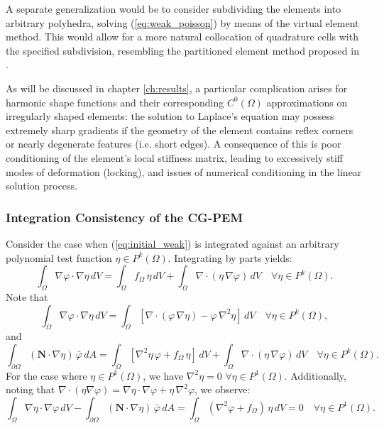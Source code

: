 	A separate generalization would be to consider subdividing the elements into arbitrary polyhedra, solving (\ref{eq:weak_poisson}) by means of the virtual element method. This would allow for a more natural collocation of quadrature cells with the specified subdivision, resembling the partitioned element method proposed in \cite{Rashid:12}.
	
	As will be discussed in chapter \ref{ch:results}, a particular complication arises for harmonic shape functions and their corresponding $C^0 (\Omega)$ approximations on irregularly shaped elements: the solution to Laplace's equation may possess extremely sharp gradients if the geometry of the element contains reflex corners or nearly degenerate features (i.e. short edges). A consequence of this is poor conditioning of the element's local stiffness matrix, leading to excessively stiff modes of deformation (locking), and issues of numerical conditioning in the linear solution process.
	
\subsubsection*{Integration Consistency of the CG-PEM}

	Consider the case when (\ref{eq:initial_weak}) is integrated against an arbitrary polynomial test function $\eta \in P^k (\Omega)$. Integrating by parts yields:
	\begin{equation}
		\int_\Omega \nabla \varphi \cdot \nabla \eta \, dV = \int_\Omega f_{\Omega} \, \eta \, dV + \int_{\Omega} \nabla \cdot (\eta \, \nabla \varphi) \, dV \quad \forall \eta \in P^k (\Omega).
	\end{equation}
	Note that
	\begin{equation}
		\int_\Omega \nabla \varphi \cdot \nabla \eta \, dV = \int_\Omega \left[ \nabla \cdot (\varphi \, \nabla \eta) - \varphi \, \nabla^2 \eta \right] \, dV \quad \forall \eta \in P^k (\Omega),
	\end{equation}
	and
	\begin{equation}
		\int_{\partial \Omega} (\mathbf{N} \cdot \nabla \eta) \, \bar{\varphi} \, dA = \int_\Omega \left[ \nabla^2 \eta \, \varphi + f_{\Omega} \, \eta \right] \, dV + \int_{\Omega} \nabla \cdot (\eta \, \nabla \varphi) \, dV \quad \forall \eta \in P^k (\Omega).
	\end{equation}
	For the case where $\eta \in P^1 (\Omega)$, we have $\nabla^2 \eta = 0 \, \, \forall \eta \in P^1 (\Omega)$. Additionally, noting that $\nabla \cdot (\eta \nabla \varphi) = \nabla \eta \cdot \nabla \varphi + \eta \, \nabla^2 \varphi$, we observe:
	\begin{equation}
		\int_{\Omega} \nabla \eta \cdot \nabla \varphi \, dV - \int_{\partial \Omega} (\mathbf{N} \cdot \nabla \eta) \, \bar{\varphi} \, dA = \int_\Omega (\nabla^2 \varphi + f_{\Omega}) \, \eta \, dV = 0 \quad \forall \eta \in P^1 (\Omega).
	\end{equation}
	
